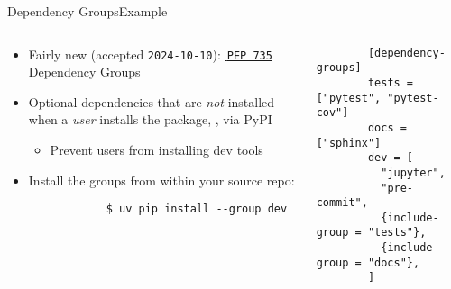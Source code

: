 \begin{splitframe}[fragile]{Dependency Groups}{Example}
  \begin{columns}[t,onlytextwidth]
    \begin{column}{0.58\textwidth}
      \begin{itemize}
        \setlength{\itemsep}{1em}
        \item Fairly new (accepted \texttt{2024-10-10}): \href{https://peps.python.org/pep-0735/}{{\footnotesize{\faExternalLink*}}\,\texttt{PEP 735}} Dependency Groups
        \item Optional dependencies that are \emph{not} installed when a \emph{user} installs the package, \eg, via PyPI
          \begin{itemize}
            \item [\to] Prevent users from installing dev tools
          \end{itemize}
        \item Install the groups from within your source repo:
          \begin{verbatim}
            $ uv pip install --group dev
          \end{verbatim}
      \end{itemize}
    \end{column}
    \hfill
    \begin{column}{0.38\textwidth}
      \begin{verbatim}
        [dependency-groups]
        tests = ["pytest", "pytest-cov"]
        docs = ["sphinx"]
        dev = [
          "jupyter",
          "pre-commit",
          {include-group = "tests"},
          {include-group = "docs"},
        ]
      \end{verbatim}
    \end{column}
  \end{columns}

\end{splitframe}

